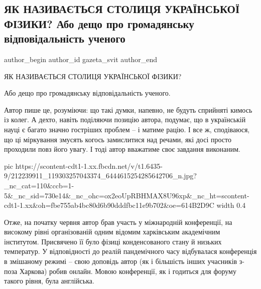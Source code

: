  
 
 
 
 
 
\subsection{ЯК НАЗИВАЄТЬСЯ СТОЛИЦЯ УКРАЇНСЬКОЇ ФІЗИКИ? Або дещо про громадянську відповідальність ученого}
\label{sec:03_07_2021.fb.gazeta_svit.1.harkov_fizika}
 
\ifcmt
 author_begin
   author_id gazeta_svit
 author_end
\fi

ЯК НАЗИВАЄТЬСЯ СТОЛИЦЯ УКРАЇНСЬКОЇ ФІЗИКИ?

Або дещо про громадянську відповідальність ученого.

Автор пише це, розуміючи: що такі думки, напевно, не будуть сприйняті кимось із
колег. А дехто, навіть поділяючи позицію автора, подумає, що в українській
науці є багато значно гостріших проблем – і матиме рацію. І все ж, сподіваюся,
що ці міркування змусять когось замислитися над речами, які досі просто
проходили повз його увагу. І тоді автор вважатиме своє завдання виконаним.

\ifcmt
  pic https://scontent-cdt1-1.xx.fbcdn.net/v/t1.6435-9/212239911_119303257043374_6444615254285642706_n.jpg?_nc_cat=110&ccb=1-5&_nc_sid=730e14&_nc_ohc=ox2eoUpRBHMAX8U96xp&_nc_ht=scontent-cdt1-1.xx&oh=fbe755ab4bc80d6b90dddfbc11e9b702&oe=614B2D9C
  width 0.4
\fi

Отже, на початку червня автор брав участь у міжнародній конференції, на
високому рівні організованій одним відомим харківським академічним інститутом.
Присвячено її було фізиці конденсованого стану й низьких температур. У
відповідності до реалій пандемічного часу відбувалася конференція в змішаному
режимі – свою доповідь автор (як і більшість інших учасників з-поза Харкова)
робив онлайн. Мовою конференції, як і годиться для форуму такого рівня, була
англійська.

